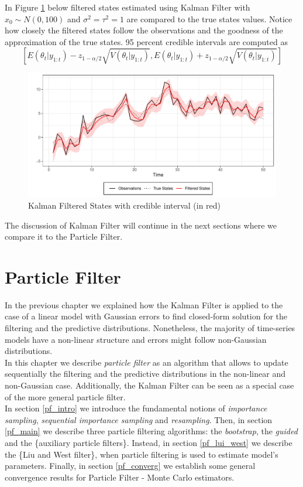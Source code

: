 \documentclass[
]{book}
\theoremstyle{break}
\theoremstyle{nonumberplain}
\begin{document}
In Figure \ref{fig:myfig2} below filtered states estimated using Kalman
Filter with \(x_{0} \sim N(0,100)\) and \(\sigma^{2}=\tau^{2}=1\) are
compared to the true states values. Notice how closely the filtered
states follow the observations and the goodness of the approximation of
the true states. 95 percent credible intervals are computed as
\[[E(\theta_{t}|y_{1:t})-z_{1-\alpha/2}\sqrt{V(\theta_{t}|y_{1:t})},E(\theta_{t}|y_{1:t})+z_{1-\alpha/2}\sqrt{V(\theta_{t}|y_{1:t})}]\]

\begin{figure}[H]

{\centering \includegraphics{prova_knit_finale_files/figure-latex/myfig2-1} 

}

\caption{Kalman Filtered States with credible interval (in red)}\label{fig:myfig2}
\end{figure}

The discussion of Kalman Filter will continue in the next sections where
we compare it to the Particle Filter.

\chapter{Particle Filter}

In the previous chapter we explained how the Kalman Filter is applied to
the case of a linear model with Gaussian errors to find closed-form
solution for the filtering and the predictive distributions.
Nonetheless, the majority of time-series models have a non-linear
structure and errors might follow non-Gaussian distributions.\\
In this chapter we describe \textit{particle filter} as an algorithm
that allows to update sequentially the filtering and the predictive
distributions in the non-linear and non-Gaussian case. Additionally, the
Kalman Filter can be seen as a special case of the more general particle
filter.\\
In section \ref{pf_intro} we introduce the fundamental notions of
\textit{importance sampling}, \textit{sequential importance sampling}
and \textit{resampling}. Then, in section \ref{pf_main} we describe
three particle filtering algorithms: the \textit{bootstrap}, the
\textit{guided} and the \{auxiliary particle filters\}. Instead, in
section \ref{pf_lui_west} we describe the \{Liu and West filter\}, when
particle filtering is used to estimate model's parameters. Finally, in
section \ref{pf_converg} we establish some general convergence results
for Particle Filter - Monte Carlo estimators.
\end{document}
